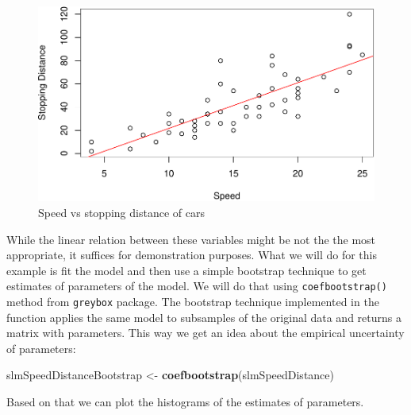 \documentclass[
]{book}
\newenvironment{Shaded}{\begin{snugshade}}{\end{snugshade}}
\newcommand{\AttributeTok}[1]{\textcolor[rgb]{0.13,0.29,0.53}{#1}}
\newcommand{\DecValTok}[1]{\textcolor[rgb]{0.00,0.00,0.81}{#1}}
\newcommand{\FunctionTok}[1]{\textcolor[rgb]{0.13,0.29,0.53}{\textbf{#1}}}
\newcommand{\NormalTok}[1]{#1}
\newcommand{\OtherTok}[1]{\textcolor[rgb]{0.56,0.35,0.01}{#1}}
\newcommand{\SpecialCharTok}[1]{\textcolor[rgb]{0.81,0.36,0.00}{\textbf{#1}}}
\newcommand{\StringTok}[1]{\textcolor[rgb]{0.31,0.60,0.02}{#1}}
\theoremstyle{definition}
\theoremstyle{definition}
\theoremstyle{definition}
\theoremstyle{definition}
\theoremstyle{remark}
\begin{document}
\begin{figure}
\centering
\includegraphics{Svetunkov---Statistics-for-Business-Analytics_files/figure-latex/scatterSpeedDistance-1.pdf}
\caption{\label{fig:scatterSpeedDistance}Speed vs stopping distance of cars}
\end{figure}

While the linear relation between these variables might be not the the most appropriate, it suffices for demonstration purposes. What we will do for this example is fit the model and then use a simple bootstrap technique to get estimates of parameters of the model. We will do that using \texttt{coefbootstrap()} method from \texttt{greybox} package. The bootstrap technique implemented in the function applies the same model to subsamples of the original data and returns a matrix with parameters. This way we get an idea about the empirical uncertainty of parameters:

\begin{Shaded}
\begin{Highlighting}[]
\NormalTok{slmSpeedDistanceBootstrap }\OtherTok{\textless{}{-}} \FunctionTok{coefbootstrap}\NormalTok{(slmSpeedDistance)}
\end{Highlighting}
\end{Shaded}

Based on that we can plot the histograms of the estimates of parameters.

\begin{Shaded}
\end{Shaded}
\end{document}
